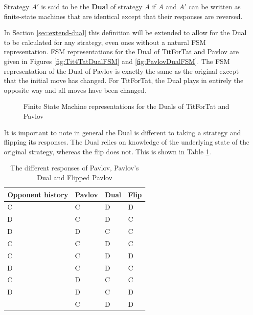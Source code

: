 \begin{definition}\label{def:dual}
Strategy $A'$ is said to be the \textbf{Dual} of strategy $A$ if $A$ and $A'$ can be written as finite-state machines that are identical except that their responses are reversed.
\end{definition}

In Section \ref{sec:extend-dual} this definition will be extended to allow for the Dual to be calculated for any strategy, even ones without a natural FSM representation.
FSM representations for the Dual of TitForTat and Pavlov are given in Figures \ref{fig:Tit4TatDualFSM} and \ref{fig:PavlovDualFSM}.
The FSM representation of the Dual of Pavlov is exactly the same as the original except that the initial move has changed.
For TitForTat, the Dual plays in entirely the opposite way and all moves have been changed.

\begin{figure}[hbtp!]
\centering
{}
\caption{Finite State Machine representations for the Duals of TitForTat and Pavlov}
\end{figure}

It is important to note in general the Dual is different to taking a strategy and flipping its responses.
The Dual relies on knowledge of the underlying state of the original strategy, whereas the flip does not.
This is shown in Table \ref{tab:strat-dual-flip}.

\begin{table}[htbp]
    \centering
    \begin{tabular}{l l l l}
        \toprule
        Opponent history & Pavlov & Dual & Flip \\
        \midrule
        C & C & D & D \\
        D & C & D & C \\
        D & D & C & C \\
        C & C & D & C \\
        C & C & D & D \\
        D & C & D & C \\
        C & D & C & C \\
        D & D & C & D \\
          & C & D & D \\
        \bottomrule
    \end{tabular}
    \caption{The different responses of Pavlov, Pavlov's Dual and Flipped Pavlov}
    \label{tab:strat-dual-flip}
\end{table}

